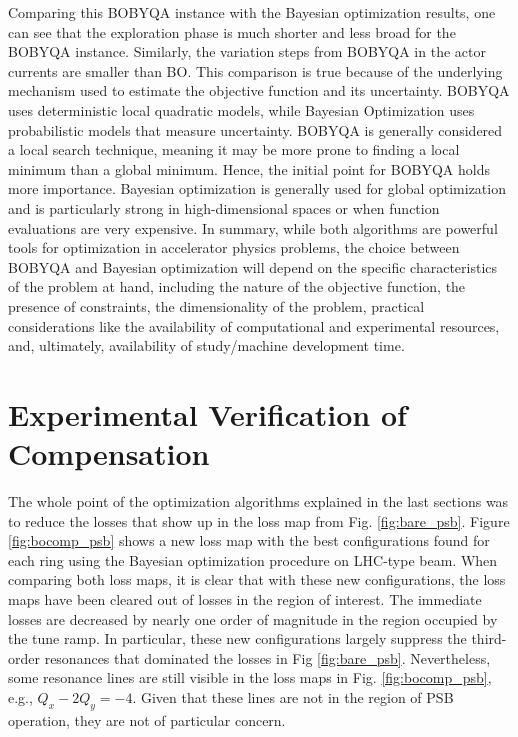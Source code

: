 Comparing this BOBYQA instance with the Bayesian optimization results, one can see that the exploration phase is much shorter and less broad for the BOBYQA instance. Similarly, the variation steps from BOBYQA in the actor currents are smaller than BO. This comparison is true because of the underlying mechanism used to estimate the objective function and its uncertainty. BOBYQA uses deterministic local quadratic models, while Bayesian Optimization uses probabilistic models that measure uncertainty. BOBYQA is generally considered a local search technique, meaning it may be more prone to finding a local minimum than a global minimum. Hence, the initial point for BOBYQA holds more importance. Bayesian optimization is generally used for global optimization and is particularly strong in high-dimensional spaces or when function evaluations are very expensive. In summary, while both algorithms are powerful tools for optimization in accelerator physics problems, the choice between BOBYQA and Bayesian optimization will depend on the specific characteristics of the problem at hand, including the nature of the objective function, the presence of constraints, the dimensionality of the problem, practical considerations like the availability of computational and experimental resources, and, ultimately, availability of study/machine development time.  

\section{Experimental Verification of Compensation}

The whole point of the optimization algorithms explained in the last sections was to reduce the losses that show up in the loss map from Fig. \ref{fig:bare_psb}. Figure \ref{fig:bocomp_psb} shows a new loss map with the best configurations found for each ring using the Bayesian optimization procedure on LHC-type beam. When comparing both loss maps, it is clear that with these new configurations, the loss maps have been cleared out of losses in the region of interest. The immediate losses are decreased by nearly one order of magnitude in the region occupied by the tune ramp. In particular, these new configurations largely suppress the third-order resonances that dominated the losses in Fig \ref{fig:bare_psb}. Nevertheless, some resonance lines are still visible in the loss maps in Fig. \ref{fig:bocomp_psb}, e.g., $Q_x - 2 Q_y = -4$. Given that these lines are not in the region of PSB operation, they are not of particular concern. 

